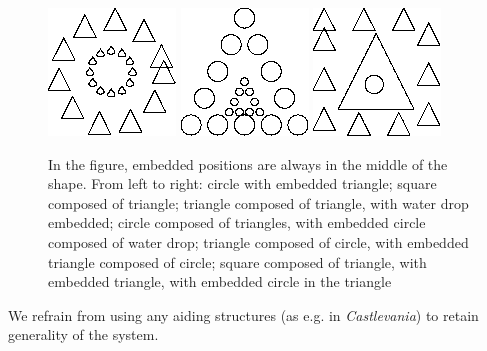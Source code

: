 \begin{figure}[p]
\centering
\includegraphics[width=.3\linewidth]{ext/images/comp_in_comp.png}
\quad
\includegraphics[width=.3\linewidth]{ext/images/comp_in_comp2.png}
\quad
\includegraphics[width=.3\linewidth]{ext/images/triple.png}
\caption{In the figure, embedded positions are always in the middle of the shape. From left to right: circle with embedded triangle; square composed of triangle; triangle composed of triangle, with water drop embedded; circle composed of triangles, with embedded circle composed of water drop; triangle composed of circle, with embedded triangle composed of circle; square composed of triangle, with embedded triangle, with embedded circle in the triangle}
\label{fig:examples}
\end{figure}


We refrain from using any aiding structures (as e.g. in \emph{Castlevania}) to retain generality of the system.

